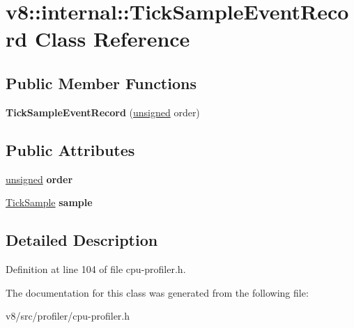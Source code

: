 \hypertarget{classv8_1_1internal_1_1TickSampleEventRecord}{}\section{v8\+:\+:internal\+:\+:Tick\+Sample\+Event\+Record Class Reference}
\label{classv8_1_1internal_1_1TickSampleEventRecord}
\subsection*{Public Member Functions}
\begin{DoxyCompactItemize}
\item 
\mbox{\label{classv8_1_1internal_1_1TickSampleEventRecord_aded34e816837806ba11c170fa55bb5fe}} 
{\bfseries Tick\+Sample\+Event\+Record} (\mbox{\hyperlink{classunsigned}{unsigned}} order)
\end{DoxyCompactItemize}
\subsection*{Public Attributes}
\begin{DoxyCompactItemize}
\item 
\mbox{\label{classv8_1_1internal_1_1TickSampleEventRecord_a136c35b8cd9e65607f18a8a269180058}} 
\mbox{\hyperlink{classunsigned}{unsigned}} {\bfseries order}
\item 
\mbox{\label{classv8_1_1internal_1_1TickSampleEventRecord_a69f640310e3dcca5a503a0a5b71f1d27}} 
\mbox{\hyperlink{structv8_1_1internal_1_1TickSample}{Tick\+Sample}} {\bfseries sample}
\end{DoxyCompactItemize}


\subsection{Detailed Description}


Definition at line 104 of file cpu-\/profiler.\+h.



The documentation for this class was generated from the following file\+:\begin{DoxyCompactItemize}
\item 
v8/src/profiler/cpu-\/profiler.\+h\end{DoxyCompactItemize}
